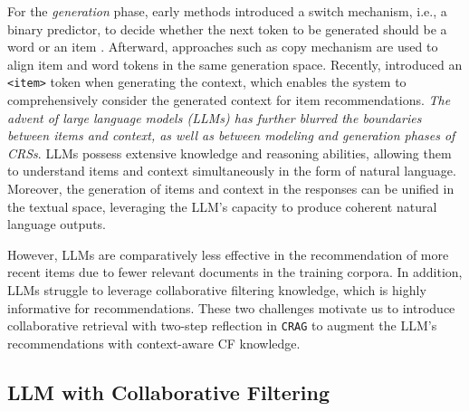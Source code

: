 For the \textit{generation} phase, early methods introduced a switch mechanism, i.e., a binary predictor, to decide whether the next token to be generated should be a word or an item \citep{li2018towards, chen2019towards}. Afterward, approaches such as copy mechanism \citep{gu2016incorporating} are used to align item and word tokens in the same generation space. Recently, \citet{wang2022towards} introduced an \texttt{<item>} token when generating the context, which enables the system to comprehensively consider the generated context for item recommendations. \textit{The advent of large language models (LLMs) has further blurred the boundaries between items and context, as well as between modeling and generation phases of CRSs}. LLMs possess extensive knowledge and reasoning abilities, allowing them to understand items and context simultaneously in the form of natural language. Moreover, the generation of items and context in the responses can be unified in the textual space, leveraging the LLM's capacity to produce coherent natural language outputs.

However, LLMs are comparatively less effective in the recommendation of more recent items due to fewer relevant documents in the training corpora. In addition, LLMs struggle to leverage collaborative filtering knowledge, which is highly informative for recommendations. These two challenges motivate us to introduce collaborative retrieval with two-step reflection in \texttt{CRAG} to augment the LLM's recommendations with context-aware CF knowledge. 

\subsection{LLM with Collaborative Filtering}

